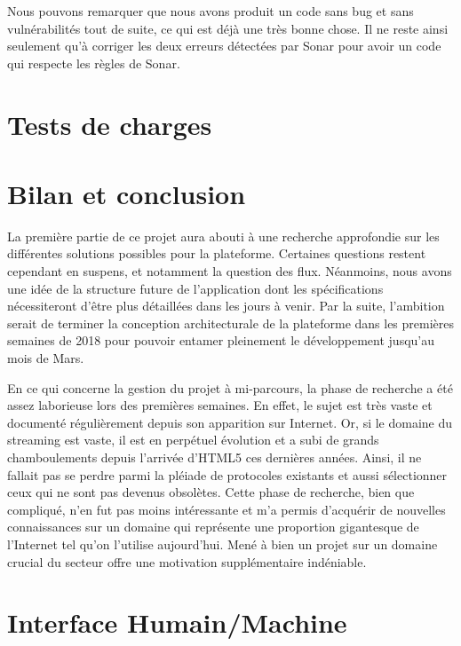 \documentclass{polytech/polytech}
\begin{document}
Nous pouvons remarquer que nous avons produit un code sans bug et sans vulnérabilités tout de suite, ce qui est déjà une très bonne chose. Il ne reste ainsi seulement qu'à corriger les deux erreurs détectées par Sonar pour avoir un code qui respecte les règles de Sonar. 


\chapter{Tests de charges}



\chapter*{Bilan et conclusion}

La première partie de ce projet aura abouti à une recherche approfondie sur les différentes solutions possibles pour la plateforme. Certaines questions restent cependant en suspens, et notamment la question des flux. Néanmoins, nous avons une idée de la structure future de l’application dont les spécifications nécessiteront d’être plus détaillées dans les jours à venir. Par la suite, l’ambition serait de terminer la conception architecturale de la plateforme dans les premières semaines de 2018 pour pouvoir entamer pleinement le développement jusqu’au mois de Mars.

En ce qui concerne la gestion du projet à mi-parcours, la phase de recherche a été assez laborieuse lors des premières semaines. En effet, le sujet est très vaste et documenté régulièrement depuis son apparition sur Internet. Or, si le domaine du streaming est vaste, il est en perpétuel évolution et a subi de grands chamboulements depuis l’arrivée d’HTML5 ces dernières années. Ainsi, il ne fallait pas se perdre parmi la pléiade de protocoles existants et aussi sélectionner ceux qui ne sont pas devenus obsolètes. Cette phase de recherche, bien que compliqué, n’en fut pas moins intéressante et m’a permis d’acquérir de nouvelles connaissances sur un domaine qui représente une proportion gigantesque de l’Internet tel qu’on l’utilise aujourd’hui. Mené à bien un projet sur un domaine crucial du secteur offre une motivation supplémentaire indéniable.


\appendix

\chapter{Interface Humain/Machine}
\end{document}
